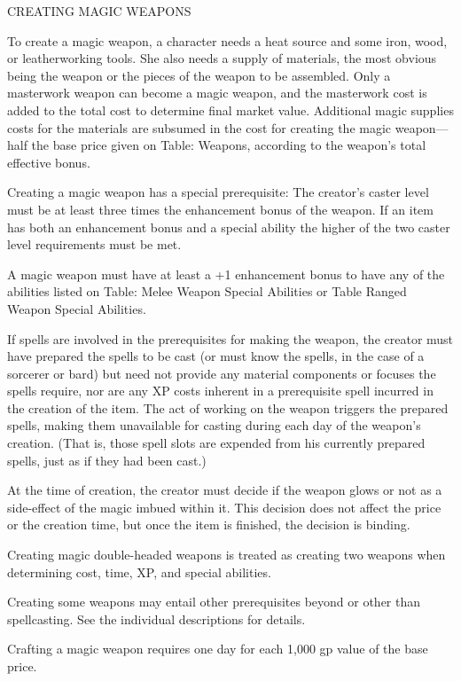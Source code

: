 \documentclass{article}
\begin{document}
\vspace{12pt}
{\large{}CREATING MAGIC WEAPONS}

To create a magic weapon, a character needs a heat source and some iron, wood, 
or leatherworking tools. She also needs a supply of materials, the most obvious 
being the weapon or the pieces of the weapon to be assembled. Only a masterwork 
weapon can become a magic weapon, and the masterwork cost is added to the total 
cost to determine final market value. Additional magic supplies costs for the materials 
are subsumed in the cost for creating the magic weapon---half the base price given 
on Table: Weapons, according to the weapon's total effective bonus.

Creating a magic weapon has a special prerequisite: The creator's caster level 
must be at least three times the enhancement bonus of the weapon. If an item has 
both an enhancement bonus and a special ability the higher of the two caster level 
requirements must be met.

A magic weapon must have at least a +1 enhancement bonus to have any of the abilities 
listed on Table: Melee Weapon Special Abilities or Table Ranged Weapon Special 
Abilities.

If spells are involved in the prerequisites for making the weapon, the creator 
must have prepared the spells to be cast (or must know the spells, in the case 
of a sorcerer or bard) but need not provide any material components or focuses 
the spells require, nor are any XP costs inherent in a prerequisite spell incurred 
in the creation of the item. The act of working on the weapon triggers the prepared 
spells, making them unavailable for casting during each day of the weapon's creation. 
(That is, those spell slots are expended from his currently prepared spells, just 
as if they had been cast.)

At the time of creation, the creator must decide if the weapon glows or not as 
a side-effect of the magic imbued within it. This decision does not affect the 
price or the creation time, but once the item is finished, the decision is binding.

Creating magic double-headed weapons is treated as creating two weapons when determining 
cost, time, XP, and special abilities.

Creating some weapons may entail other prerequisites beyond or other than spellcasting. 
See the individual descriptions for details.

Crafting a magic weapon requires one day for each 1,000 gp value of the base price.
\end{document}
